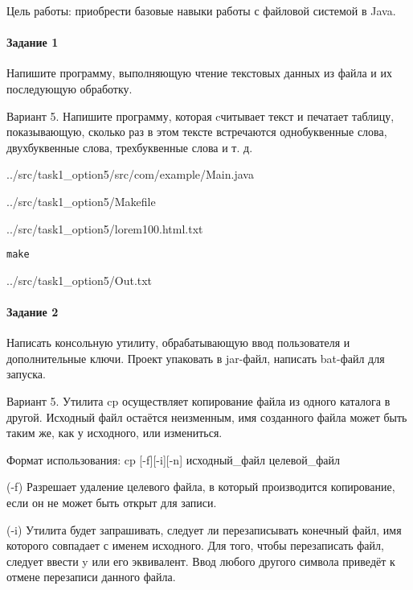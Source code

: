 Цель работы:
приобрести базовые навыки работы с файловой системой в Java.

\paragraph{Задание 1} \hspace{0pt}

Напишите программу, выполняющую чтение текстовых данных из файла и их последующую обработку.

Вариант 5.
Напишите программу, которая cчитывает текст и печатает таблицу,
показывающую, сколько раз в этом тексте встречаются однобуквенные слова,
двухбуквенные слова, трехбуквенные слова и т. д.


{../src/task1_option5/src/com/example/Main.java}


{../src/task1_option5/Makefile}


{../src/task1_option5/lorem100.html.txt}

\begin{lstlisting}[language=Terminal]
make
\end{lstlisting}


{../src/task1_option5/Out.txt}

\paragraph{Задание 2} \hspace{0pt}

Написать консольную утилиту, обрабатывающую ввод пользователя и дополнительные ключи.
Проект упаковать в jar-файл, написать bat-файл для запуска.

Вариант 5.
Утилита cp осуществляет копирование файла из одного каталога в другой.
Исходный файл остаётся неизменным, имя созданного файла может быть таким же,
как у исходного, или измениться.

Формат использования: cp [-f][-i][-n] исходный\_файл целевой\_файл

(-f) Разрешает удаление целевого файла, в который производится копирование,
если он не может быть открыт для записи.

(-i) Утилита будет запрашивать, следует ли перезаписывать конечный файл,
имя которого совпадает с именем исходного.
Для того, чтобы перезаписать файл, следует ввести y или его эквивалент.
Ввод любого другого символа приведёт к отмене перезаписи данного файла.

